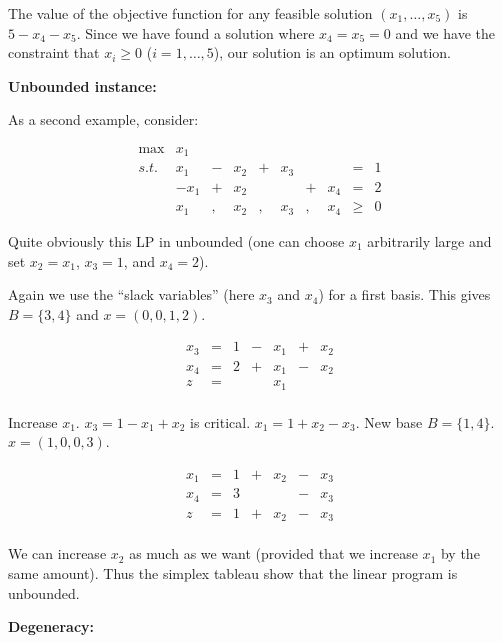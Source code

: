 \documentclass[12pt, showidx, twoside]{article}
\begin{document}
{{{The value of the objective function for any
feasible solution $(x_1,\dots,x_5)$ is $5 - x_4 - x_5$.
Since we have found a solution where $x_4 = x_5 = 0$ 
and we have the constraint that $x_i \geq 0$ 
($i=1,\dots,5$), our solution is an optimum solution.



{\bf Unbounded instance:}

As a second example, consider:

\begin{equation*}
\begin{array}{rrcrccrcrl}
\max  &  x_1 &   &      &   &     &   &    &     &  \\
 s.t. &  x_1 & - &  x_2 & + & x_3 &   &     &  =  & 1\\
      & -x_1 & + &  x_2 &   &     & + & x_4 &  =  & 2\\
      &  x_1 & , &  x_2 & , & x_3 & , & x_4 & \geq & 0
\end{array}
\end{equation*}

Quite obviously this LP in unbounded (one can choose $x_1$ arbitrarily
large and set $x_2 = x_1$, $x_3 = 1$, and $x_4 = 2$).

Again we use the ``slack variables'' (here $x_3$ and $x_4$)
for a first basis. This gives $B=\{3,4\}$ and
$x = (0,0,1,2)$.

\[
\begin{array}{ccccccc}
x_3 & = & 1 & - & x_1 & + & x_2 \\
x_4 & = & 2 & + & x_1 & - & x_2 \\ \hline
z   & = &   &   & x_1 &   &     \\
\end{array}
\]

Increase $x_1$. $x_3 = 1 - x_1 + x_2$ is critical.
$x_1 = 1 + x_2 - x_3$.  New base $B = \{1,4\}$.
$x = (1,0,0,3)$.

\[
\begin{array}{ccccccc}
x_1 & = & 1 & + & x_2 & - & x_3 \\
x_4 & = & 3 &   &     & - & x_3 \\ \hline
z   & = & 1 & + & x_2 & - & x_3 \\
\end{array}
\]

We can increase $x_2$ as much as we want (provided that we increase 
$x_1$ by the same amount). Thus the simplex tableau show that the
linear program is unbounded.

{\bf Degeneracy:}

}}}
\end{document}
